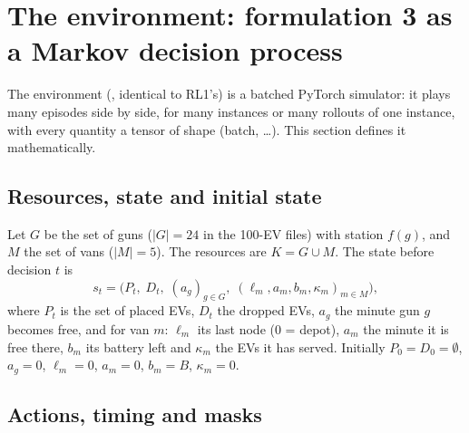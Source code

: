 \section{The environment: formulation 3 as a Markov decision process}
\label{sec:mdp}

The environment (, identical to RL1's) is a batched PyTorch simulator: it plays many episodes side by side, for many instances or many rollouts of one instance, with every quantity a tensor of shape (batch, \dots). This section defines it mathematically.

\subsection{Resources, state and initial state}

Let $G$ be the set of guns ($|G|=24$ in the 100-EV files) with station $f(g)$, and $M$ the set of vans ($|M|=5$). The resources are $K=G\cup M$. The state before decision $t$ is
\[
s_t=\Big(P_t,\;D_t,\;(a_g)_{g\in G},\;(\ell_m,a_m,b_m,\kappa_m)_{m\in M}\Big),
\]
where $P_t$ is the set of placed EVs, $D_t$ the dropped EVs, $a_g$ the minute gun $g$ becomes free, and for van $m$: $\ell_m$ its last node (0 = depot), $a_m$ the minute it is free there, $b_m$ its battery left and $\kappa_m$ the EVs it has served. Initially $P_0=D_0=\emptyset$, $a_g=0$, $\ell_m=0$, $a_m=0$, $b_m=B$, $\kappa_m=0$.

\subsection{Actions, timing and masks}


